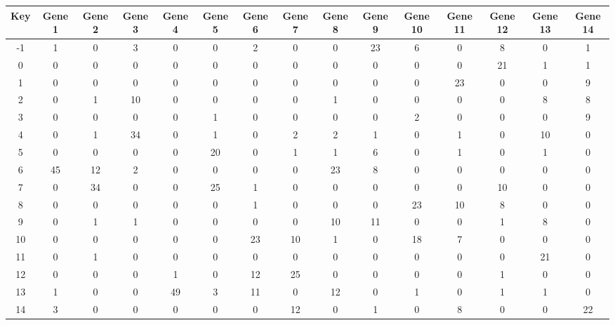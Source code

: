 \begin{tabular}{|c|c|c|c|c|c|c|c|c|c|c|c|c|c|c|}
\hline
Key & Gene 1 & Gene 2 & Gene 3 & Gene 4 & Gene 5 & Gene 6 & Gene 7 & Gene 8 & Gene 9 & Gene 10 & Gene 11 & Gene 12 & Gene 13 & Gene 14 \\
\hline
-1 & 1 & 0 & 3 & 0 & 0 & 2 & 0 & 0 & 23 & 6 & 0 & 8 & 0 & 1 \\
0 & 0 & 0 & 0 & 0 & 0 & 0 & 0 & 0 & 0 & 0 & 0 & 21 & 1 & 1 \\
1 & 0 & 0 & 0 & 0 & 0 & 0 & 0 & 0 & 0 & 0 & 23 & 0 & 0 & 9 \\
2 & 0 & 1 & 10 & 0 & 0 & 0 & 0 & 1 & 0 & 0 & 0 & 0 & 8 & 8 \\
3 & 0 & 0 & 0 & 0 & 1 & 0 & 0 & 0 & 0 & 2 & 0 & 0 & 0 & 9 \\
4 & 0 & 1 & 34 & 0 & 1 & 0 & 2 & 2 & 1 & 0 & 1 & 0 & 10 & 0 \\
5 & 0 & 0 & 0 & 0 & 20 & 0 & 1 & 1 & 6 & 0 & 1 & 0 & 1 & 0 \\
6 & 45 & 12 & 2 & 0 & 0 & 0 & 0 & 23 & 8 & 0 & 0 & 0 & 0 & 0 \\
7 & 0 & 34 & 0 & 0 & 25 & 1 & 0 & 0 & 0 & 0 & 0 & 10 & 0 & 0 \\
8 & 0 & 0 & 0 & 0 & 0 & 1 & 0 & 0 & 0 & 23 & 10 & 8 & 0 & 0 \\
9 & 0 & 1 & 1 & 0 & 0 & 0 & 0 & 10 & 11 & 0 & 0 & 1 & 8 & 0 \\
10 & 0 & 0 & 0 & 0 & 0 & 23 & 10 & 1 & 0 & 18 & 7 & 0 & 0 & 0 \\
11 & 0 & 1 & 0 & 0 & 0 & 0 & 0 & 0 & 0 & 0 & 0 & 0 & 21 & 0 \\
12 & 0 & 0 & 0 & 1 & 0 & 12 & 25 & 0 & 0 & 0 & 0 & 1 & 0 & 0 \\
13 & 1 & 0 & 0 & 49 & 3 & 11 & 0 & 12 & 0 & 1 & 0 & 1 & 1 & 0 \\
14 & 3 & 0 & 0 & 0 & 0 & 0 & 12 & 0 & 1 & 0 & 8 & 0 & 0 & 22 \\
\hline
\end{tabular}